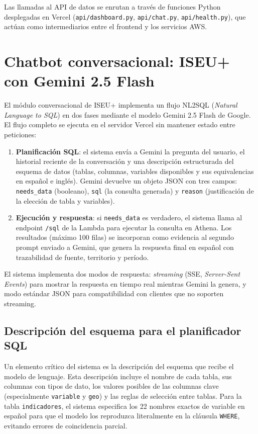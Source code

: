 Las llamadas al API de datos se enrutan a través de funciones Python desplegadas en Vercel (\texttt{api/dashboard.py}, \texttt{api/chat.py}, \texttt{api/health.py}), que actúan como intermediarios entre el frontend y los servicios AWS.

\section{Chatbot conversacional: ISEU+ con Gemini 2.5 Flash}

El módulo conversacional de ISEU+ implementa un flujo NL2SQL (\textit{Natural Language to SQL}) en dos fases mediante el modelo Gemini 2.5 Flash de Google. El flujo completo se ejecuta en el servidor Vercel sin mantener estado entre peticiones:

\begin{enumerate}
  \item \textbf{Planificación SQL}: el sistema envía a Gemini la pregunta del usuario, el historial reciente de la conversación y una descripción estructurada del esquema de datos (tablas, columnas, variables disponibles y sus equivalencias en español e inglés). Gemini devuelve un objeto JSON con tres campos: \texttt{needs\_data} (booleano), \texttt{sql} (la consulta generada) y \texttt{reason} (justificación de la elección de tabla y variables).

  \item \textbf{Ejecución y respuesta}: si \texttt{needs\_data} es verdadero, el sistema llama al endpoint \texttt{/sql} de la Lambda para ejecutar la consulta en Athena. Los resultados (máximo 100 filas) se incorporan como evidencia al segundo prompt enviado a Gemini, que genera la respuesta final en español con trazabilidad de fuente, territorio y período.
\end{enumerate}

El sistema implementa dos modos de respuesta: \textit{streaming} (SSE, \textit{Server-Sent Events}) para mostrar la respuesta en tiempo real mientras Gemini la genera, y modo estándar JSON para compatibilidad con clientes que no soporten streaming.

\subsection{Descripción del esquema para el planificador SQL}

Un elemento crítico del sistema es la descripción del esquema que recibe el modelo de lenguaje. Esta descripción incluye el nombre de cada tabla, sus columnas con tipos de dato, los valores posibles de las columnas clave (especialmente \texttt{variable} y \texttt{geo}) y las reglas de selección entre tablas. Para la tabla \texttt{indicadores}, el sistema especifica los 22 nombres exactos de variable en español para que el modelo los reproduzca literalmente en la cláusula \texttt{WHERE}, evitando errores de coincidencia parcial.

